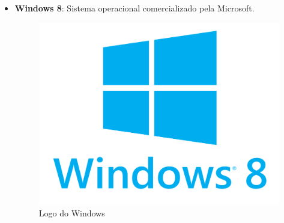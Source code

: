 \documentclass[11pt]{article} %
\begin{document}
\begin{itemize}
\item \textbf{Windows 8}: Sistema operacional comercializado pela Microsoft.

\begin{figure}[!htp]
\centering
\includegraphics[scale=0.05]{pictures/windows.png}
\caption{Logo do Windows}
\label{Logo do Windows}
\end{figure}

\end{itemize}
\end{document}
